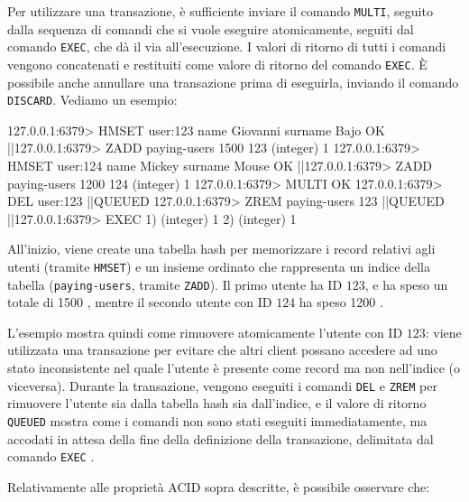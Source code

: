Per utilizzare una transazione, è sufficiente inviare il comando \verb|MULTI|, seguito dalla 
sequenza di comandi che si vuole eseguire atomicamente, seguiti dal comando \verb|EXEC|, che dà
il via all'esecuzione. I valori di ritorno di tutti i comandi vengono concatenati e restituiti come
valore di ritorno del comando \verb|EXEC|. È possibile anche annullare una transazione prima di
eseguirla, inviando il comando \verb|DISCARD|. Vediamo un esempio:

\begin{commentedsource}[style=redis]
127.0.0.1:6379> HMSET user:123 name Giovanni surname Bajo
OK
|\lnote|127.0.0.1:6379> ZADD paying-users 1500 123
(integer) 1
127.0.0.1:6379> HMSET user:124 name Mickey surname Mouse
OK
|\lnote|127.0.0.1:6379> ZADD paying-users 1200 124
(integer) 1
127.0.0.1:6379> MULTI
OK
127.0.0.1:6379> DEL user:123
|\lnote|QUEUED
127.0.0.1:6379> ZREM paying-users 123
|\lnote|QUEUED
|\lnote|127.0.0.1:6379> EXEC
1) (integer) 1
2) (integer) 1
\end{commentedsource}

All'inizio, viene create una tabella hash per memorizzare i record relativi agli utenti (tramite
\verb|HMSET|) e un insieme ordinato che rappresenta un indice della tabella (\verb|paying-users|,
tramite \verb|ZADD|). Il primo utente ha ID $123$, e ha speso un totale di \SI{1500}{\EUR}
, mentre il secondo utente con ID $124$ ha speso \SI{1200}{\EUR} .

L'esempio mostra quindi come rimuovere atomicamente l'utente con ID $123$: viene utilizzata una
transazione per evitare che altri client possano accedere ad uno stato inconsistente nel quale
l'utente è presente come record ma non nell'indice (o viceversa). Durante la transazione,
vengono eseguiti i comandi \verb|DEL| e \verb|ZREM| per rimuovere l'utente sia dalla tabella
hash sia dall'indice, e il valore di ritorno \verb|QUEUED|   mostra come
i comandi non sono stati eseguiti immediatamente, ma accodati in attesa della fine della 
definizione della transazione, delimitata dal comando \verb|EXEC| .

Relativamente alle proprietà ACID sopra descritte, è possibile osservare che:

